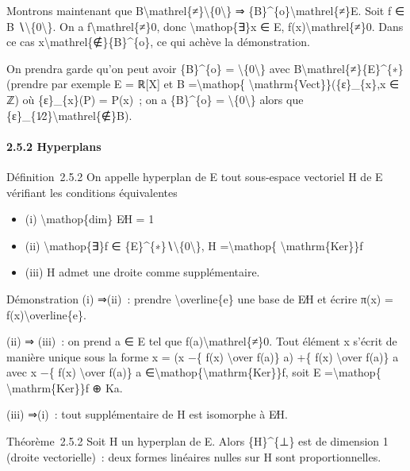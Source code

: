 \documentclass[]{article}
\begin{document}
Montrons maintenant que
B\textbackslash{}mathrel\{≠\}\textbackslash{}\{0\textbackslash{}\} ⇒
\{B\}\^{}\{o\}\textbackslash{}mathrel\{≠\}E. Soit f ∈ B
∖\textbackslash{}\{0\textbackslash{}\}. On a
f\textbackslash{}mathrel\{≠\}0, donc \textbackslash{}mathop\{∃\}x ∈ E,
f(x)\textbackslash{}mathrel\{≠\}0. Dans ce cas
x\textbackslash{}mathrel\{∉\}\{B\}\^{}\{o\}, ce qui achève la
démonstration.

On prendra garde qu'on peut avoir \{B\}\^{}\{o\} =
\textbackslash{}\{0\textbackslash{}\} avec
B\textbackslash{}mathrel\{≠\}\{E\}\^{}\{∗\} (prendre par exemple E =
ℝ{[}X{]} et B =\textbackslash{}mathop\{
\textbackslash{}mathrm\{Vect\}\}(\{ε\}\_\{x\},x ∈ ℤ) où \{ε\}\_\{x\}(P)
= P(x)~; on a \{B\}\^{}\{o\} = \textbackslash{}\{0\textbackslash{}\}
alors que \{ε\}\_\{1∕2\}\textbackslash{}mathrel\{∉\}B).

\paragraph{2.5.2 Hyperplans}

Définition~2.5.2 On appelle hyperplan de E tout sous-espace vectoriel H
de E vérifiant les conditions équivalentes

\begin{itemize}
\itemsep1pt\parskip0pt
\item
  (i) \textbackslash{}mathop\{dim\} E∕H = 1
\item
  (ii) \textbackslash{}mathop\{∃\}f ∈
  \{E\}\^{}\{∗\}∖\textbackslash{}\{0\textbackslash{}\}, H
  =\textbackslash{}mathop\{ \textbackslash{}mathrm\{Ker\}\}f
\item
  (iii) H admet une droite comme supplémentaire.
\end{itemize}

Démonstration (i) ⇒(ii)~: prendre \textbackslash{}overline\{e\} une base
de E∕H et écrire π(x) = f(x)\textbackslash{}overline\{e\}.

(ii) ⇒ (iii)~: on prend a ∈ E tel que f(a)\textbackslash{}mathrel\{≠\}0.
Tout élément x s'écrit de manière unique sous la forme x = (x −\{ f(x)
\textbackslash{}over f(a)\} a) +\{ f(x) \textbackslash{}over f(a)\} a
avec x −\{ f(x) \textbackslash{}over f(a)\} a
∈\textbackslash{}mathop\{\textbackslash{}mathrm\{Ker\}\}f, soit E
=\textbackslash{}mathop\{ \textbackslash{}mathrm\{Ker\}\}f ⊕ Ka.

(iii) ⇒(i)~: tout supplémentaire de H est isomorphe à E∕H.

Théorème~2.5.2 Soit H un hyperplan de E. Alors \{H\}\^{}\{⊥\} est de
dimension 1 (droite vectorielle)~: deux formes linéaires nulles sur H
sont proportionnelles.
\end{document}
